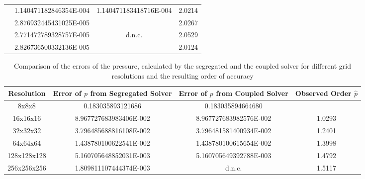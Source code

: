 \begin{table}[h!]
\begin{tabular}{cccc}
    \rowcolor{tud0a} \multirow{-3}{*}{128x128x128}& 1.140471182846354E-004 & 1.140471183418716E-004 & 2.0214  \\ %
    \rowcolor{black!00}\multirow{3}{*}{}             & 2.876932445431025E-005 & & 2.0267 \\
    \rowcolor{black!00}                              & 2.771472789328757E-005 & d.n.c. & 2.0529 \\
    \rowcolor{black!00} \multirow{-3}{*}{256x256x256}& 2.826736500332136E-005 & & 2.0124 \\ %
  \end{tabular}
  \label{tab:velorder}
\end{table}

\begin{table}[h!]\centering
{}
  \caption{Comparison of the errors of the pressure, calculated by the segregated and the coupled solver for different grid resolutions and the resulting order of accuracy}
  \begin{tabular}{cccc}\toprule
    Resolution & Error of \(p\) from Segregated Solver & Error of \(p\) from Coupled Solver & Observed Order \(\hat{p}\) \\
    \midrule
    \rowcolor{tud0a} 8x8x8       & 0.183035893121686      &  0.183035894664680      &        \\%
    \rowcolor{black!00} 16x16x16    & 8.967727683983406E-002 &  8.967727683982576E-002 & 1.0293 \\%
    \rowcolor{tud0a} 32x32x32    & 3.796485688816108E-002 &  3.796481581400934E-002 & 1.2401 \\%
    \rowcolor{black!00} 64x64x64    & 1.438780100622541E-002 &  1.438780100615654E-002 & 1.3998 \\%
    \rowcolor{tud0a} 128x128x128 & 5.160705648852031E-003 &  5.160705649392788E-003 & 1.4792 \\%
    \rowcolor{black!00} 256x256x256 & 1.809811107444374E-003 &  d.n.c.                 & 1.5117 \\%
  \end{tabular}
  \label{tab:pressorder}
\end{table}

